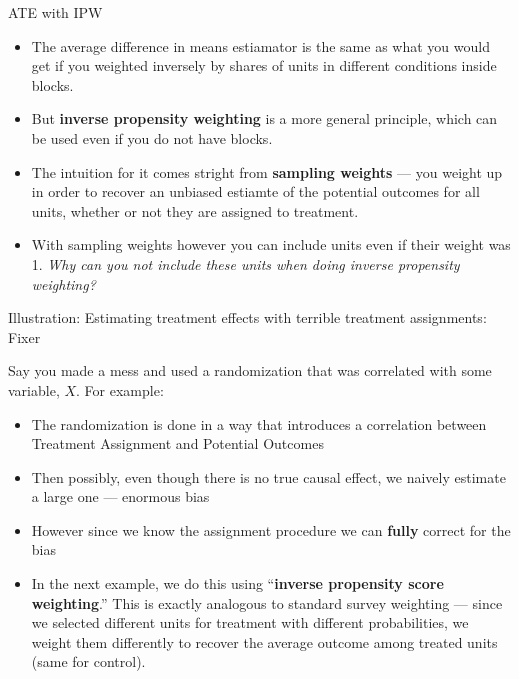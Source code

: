 \documentclass[
  11pt,
  ignorenonframetext,
]{beamer}
\providecommand{\tightlist}{%
  \setlength{\itemsep}{0pt}\setlength{\parskip}{0pt}}\usepackage{longtable,booktabs,array}
\begin{document}
\begin{frame}{ATE with IPW}
\protect\hypertarget{ate-with-ipw}{}
\begin{itemize}
\item
  The average difference in means estiamator is the same as what you
  would get if you weighted inversely by shares of units in different
  conditions inside blocks.
\item
  But \textbf{inverse propensity weighting} is a more general principle,
  which can be used even if you do not have blocks.
\item
  The intuition for it comes stright from \textbf{sampling weights} ---
  you weight up in order to recover an unbiased estiamte of the
  potential outcomes for all units, whether or not they are assigned to
  treatment.
\item
  With sampling weights however you can include units even if their
  weight was 1. \emph{Why can you not include these units when doing
  inverse propensity weighting?}
\end{itemize}
\end{frame}

\begin{frame}{Illustration: Estimating treatment effects with terrible
treatment assignments: Fixer\label{Fixer}}
\protect\hypertarget{illustration-estimating-treatment-effects-with-terrible-treatment-assignments-fixer}{}
\footnotesize

Say you made a mess and used a randomization that was correlated with
some variable, \(X\). For example:

\begin{itemize}
\tightlist
\item
  The randomization is done in a way that introduces a correlation
  between Treatment Assignment and Potential Outcomes
\item
  Then possibly, even though there is no true causal effect, we naively
  estimate a large one --- enormous bias
\item
  However since we know the assignment procedure we can \textbf{fully}
  correct for the bias
\item
  In the next example, we do this using ``\textbf{inverse propensity
  score weighting}.'' This is exactly analogous to standard survey
  weighting --- since we selected different units for treatment with
  different probabilities, we weight them differently to recover the
  average outcome among treated units (same for control).
\end{itemize}
\end{frame}
\end{document}
